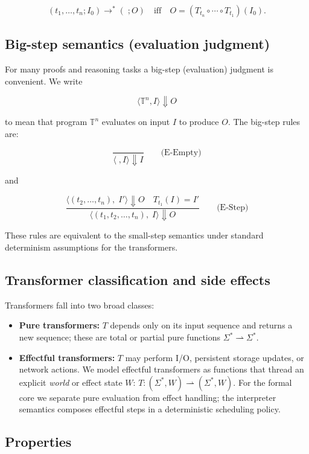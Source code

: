 \documentclass[sigplan,screen]{acmart}
\begin{document}
\[
(t_1,\dots,t_n; I_0) \longrightarrow^{*} (\; ; O) \quad\text{iff}\quad O = (T_{t_n}\circ\cdots\circ T_{t_1})(I_0).
\]



\subsection{Big-step semantics (evaluation judgment)}
For many proofs and reasoning tasks a big-step (evaluation) judgment is convenient.  We write


\[
\langle \mathbb{T}^n, I \rangle \Downarrow O
\]


to mean that program \(\mathbb{T}^n\) evaluates on input \(I\) to produce \(O\).  The big-step rules are:



\[
\frac{}{\langle \; , I \rangle \Downarrow I} \qquad\text{(E-Empty)}
\]

and

\[
\frac{\langle (t_2,\dots,t_n),\; I' \rangle \Downarrow O \quad T_{t_1}(I)=I'}{\langle (t_1,t_2,\dots,t_n),\; I \rangle \Downarrow O} \qquad\text{(E-Step)}
\]



These rules are equivalent to the small-step semantics under standard determinism assumptions for the transformers.

\subsection{Transformer classification and side effects}
Transformers fall into two broad classes:

\begin{itemize}
  \item \textbf{Pure transformers:} \(T\) depends only on its input sequence and returns a new sequence; these are total or partial pure functions \( \Sigma^* \rightharpoonup \Sigma^* \).
  \item \textbf{Effectful transformers:} \(T\) may perform I/O, persistent storage updates, or network actions.  We model effectful transformers as functions that thread an explicit \emph{world} or effect state \(W\): \(T : (\Sigma^*, W) \rightharpoonup (\Sigma^*, W)\).  For the formal core we separate pure evaluation from effect handling; the interpreter semantics composes effectful steps in a deterministic scheduling policy.
\end{itemize}

\subsection{Properties}
\end{document}

